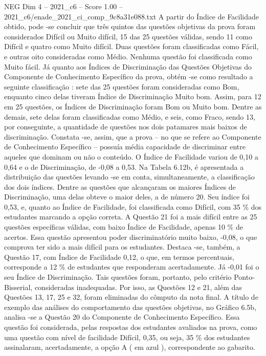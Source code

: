 \begin{textsample}{NEG Dim 4 – 2021\_c6 – Score 1.00 – 2021\_c6/enade\_2021\_ci\_comp\_9c8a31e088.txt}
A partir do Índice de Facilidade obtido, pode -se concluir que três quintos das questões objetivas da prova foram considerados Difícil ou Muito difícil, 15 das 25 questões válidas, sendo 11 como Difícil e quatro como Muito difícil.
Duas questões foram classificadas como Fácil, e outras oito consideradas como Médio.
Nenhuma questão foi classificada como Muito fácil.
Já quanto aos Índices de Discriminação das Questões Objetivas do Componente de Conhecimento Específico da prova, obtém -se como resultado a seguinte classificação : sete das 25 questões foram consideradas como Bom, enquanto cinco delas tiveram Índice de Discriminação Muito bom.
Assim, para 12 em 25 questões, os Índices de Discriminação foram Bom ou Muito bom.
Dentre as demais, sete delas foram classificadas como Médio, e seis, como Fraco, sendo 13, por conseguinte, a quantidade de questões nos dois patamares mais baixos de discriminação.
Constata -se, assim, que a prova – no que se refere ao Componente de Conhecimento Específico – possuía média capacidade de discriminar entre aqueles que dominam ou não o conteúdo.
O Índice de Facilidade variou de 0,10 a 0,64 e o de Discriminação, de -0,08 a 0,53.
Na Tabela 6.12b, é apresentada a distribuição das questões levando -se em conta, simultaneamente, a classificação dos dois índices.
Dentre as questões que alcançaram os maiores Índices de Discriminação, uma delas obteve o maior deles, a de número 20.
Seu índice foi 0,53, e, quanto ao Índice de Facilidade, foi classificada como Difícil, com 35 \% dos estudantes marcando a opção correta.
A Questão 21 foi a mais difícil entre as 25 questões específicas válidas, com baixo Índice de Facilidade, apenas 10 \% de acertos.
Essa questão apresentou poder discriminatório muito baixo, -0,08, o que comprova ter sido a mais difícil para os estudantes.
Destaca -se, também, a Questão 17, com Índice de Facilidade 0,12, o que, em termos percentuais, corresponde a 12 \% de estudantes que responderam acertadamente.
Já -0,01 foi o seu Índice de Discriminação.
Tais questões foram, portanto, pelo critério Ponto-Bisserial, consideradas inadequadas.
Por isso, as Questões 12 e 21, além das Questões 13, 17, 25 e 32, foram eliminadas do cômputo da nota final.
A título de exemplo das análises do comportamento das questões objetivas, no Gráfico 6.5b, analisa -se a Questão 20 do Componente de Conhecimento Específico.
Essa questão foi considerada, pelas respostas dos estudantes avaliados na prova, como uma questão com nível de facilidade Difícil, 0,35, ou seja, 35 \% dos estudantes assinalaram, acertadamente, a opção A ( em azul ), correspondente ao gabarito.

\end{textsample}
